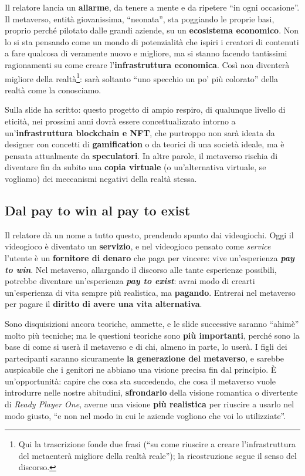 Il relatore lancia un \textbf{allarme}, da tenere a mente e da ripetere ``in ogni
occasione''. Il metaverso, entità giovanissima, ``neonata'', sta poggiando le
proprie basi, proprio perché pilotato dalle grandi aziende, su un
\textbf{ecosistema economico}. Non lo si sta pensando come un mondo di
potenzialità che ispiri i creatori di contenuti a fare qualcosa di veramente
nuovo e migliore, ma si stanno facendo tantissimi ragionamenti su come creare
l'\textbf{infrastruttura economica}. Così non diventerà migliore della
realtà\footnote{Qui la trascrizione fonde due frasi (``su come riuscire a
creare l'infrastruttura del metaenterà migliore della realtà reale''); la
ricostruzione segue il senso del discorso.}: sarà soltanto ``uno specchio un po'
più colorato'' della realtà come la conosciamo.

Sulla slide ha scritto: questo progetto di ampio respiro, di qualunque livello di
eticità, nei prossimi anni dovrà essere concettualizzato intorno a
un'\textbf{infrastruttura blockchain e NFT}, che purtroppo non sarà ideata da
designer con concetti di \textbf{gamification} o da teorici di una società
ideale, ma è pensata attualmente da \textbf{speculatori}. In altre parole, il
metaverso rischia di diventare fin da subito una \textbf{copia virtuale} (o
un'alternativa virtuale, se vogliamo) dei meccanismi negativi della realtà
stessa.

\subsection{Dal pay to win al pay to exist}

Il relatore dà un nome a tutto questo, prendendo spunto dai videogiochi. Oggi il
videogioco è diventato un \textbf{servizio}, e nel videogioco pensato come
\emph{service} l'utente è un \textbf{fornitore di denaro} che paga per vincere:
vive un'esperienza \textbf{\emph{pay to win}}. Nel metaverso, allargando il
discorso alle tante esperienze possibili, potrebbe diventare un'esperienza
\textbf{\emph{pay to exist}}: avrai modo di crearti un'esperienza di vita sempre
più realistica, ma \textbf{pagando}. Entrerai nel metaverso per pagare il
\textbf{diritto di avere una vita alternativa}.

Sono disquisizioni ancora teoriche, ammette, e le slide successive saranno
``ahimè'' molto più tecniche; ma le questioni teoriche sono \textbf{più
importanti}, perché sono la base di come si userà il metaverso e di chi, almeno
in parte, lo userà. I figli dei partecipanti saranno sicuramente \textbf{la
generazione del metaverso}, e sarebbe auspicabile che i genitori ne abbiano una
visione precisa fin dal principio. È un'opportunità: capire che cosa sta
succedendo, che cosa il metaverso vuole introdurre nelle nostre abitudini,
\textbf{sfrondarlo} della visione romantica o divertente di \emph{Ready Player
One}, averne una visione \textbf{più realistica} per riuscire a usarlo nel modo
giusto, ``e non nel modo in cui le aziende vogliono che voi lo utilizziate''.

